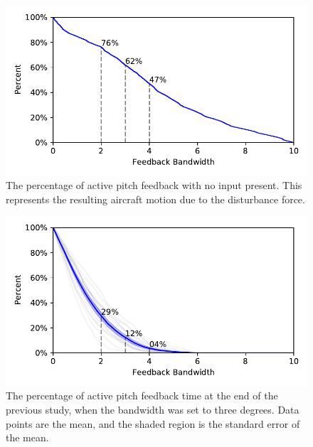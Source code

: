 \begin{figure}[tb!]
    \begin{center}
        \includegraphics[width=\linewidth]{figures/Aircraft/no_input_feedback_on.pdf}
        \caption[The mean percentage of active pitch feedback with no input present]{The percentage of active pitch feedback with no input present. This represents the resulting aircraft motion due to the disturbance force.}
        \label{figure-aircraft:noinput_pitchfeedback}
    \end{center}
\end{figure}
\begin{figure}[tb!]
    \begin{center}
        \includegraphics[width=\linewidth]{figures/Aircraft/p34_feedback_on.pdf}
        \caption[The mean percentage of active pitch feedback time at the end of the previous study]{The percentage of active pitch feedback time at the end of the previous study, when the bandwidth was set to three degrees. Data points are the mean, and the shaded region is the standard error of the mean.}
        \label{figure-aircraft:pitchfeedback}
    \end{center}
\end{figure}
